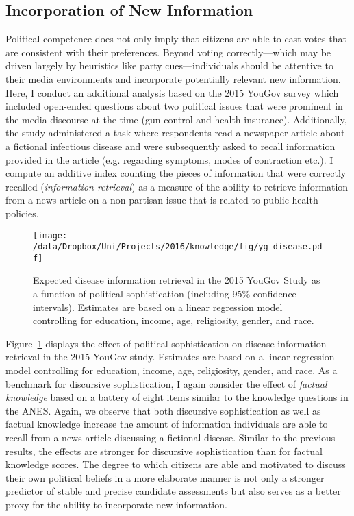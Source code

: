 \subsection*{Incorporation of New Information}
Political competence does not only imply that citizens are able to cast votes that are consistent with their preferences. Beyond voting correctly---which may be driven largely by heuristics like party cues---individuals should be attentive to their media environments and incorporate potentially relevant new information. Here, I conduct an additional analysis based on the 2015 YouGov survey which included open-ended questions about two political issues that were prominent in the media discourse at the time (gun control and health insurance). Additionally, the study administered a task where respondents read a newspaper article about a fictional infectious disease and were subsequently asked to recall information provided in the article (e.g. regarding symptoms, modes of contraction etc.). I compute an additive index counting the pieces of information that were correctly recalled (\textit{information retrieval}) as a measure of the ability to retrieve information from a news article on a non-partisan issue that is related to public health policies. 

\begin{figure}[h]\centering
\texttt{[image: /data/Dropbox/Uni/Projects/2016/knowledge/fig/yg\_disease.pdf]}
\caption{Expected disease information retrieval in the 2015 YouGov Study as a function of political sophistication (including 95\% confidence intervals). Estimates are based on a linear regression model controlling for education, income, age, religiosity, gender, and race.}\label{fig:yg_disease}
\end{figure}

Figure~\ref{fig:yg_disease} displays the effect of political sophistication on disease information retrieval in the 2015 YouGov study. Estimates are based on a linear regression model controlling for education, income, age, religiosity, gender, and race. As a benchmark for discursive sophistication, I again consider the effect of \textit{factual knowledge} based on a battery of eight items similar to the knowledge questions in the ANES. Again, we observe that both discursive sophistication as well as factual knowledge increase the amount of information individuals are able to recall from a news article discussing a fictional disease. Similar to the previous results, the effects are stronger for discursive sophistication than for factual knowledge scores. The degree to which citizens are able and motivated to discuss their own political beliefs in a more elaborate manner is not only a stronger predictor of stable and precise candidate assessments but also serves as a better proxy for the ability to incorporate new information.


